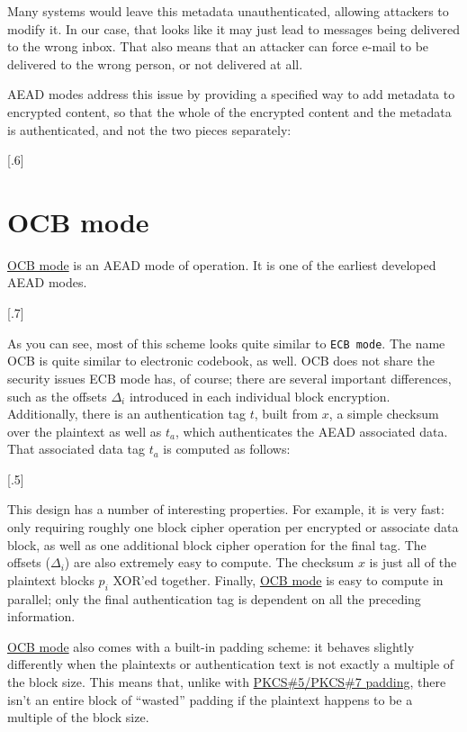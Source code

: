 \documentclass[11pt,ebook,table,dvipsnames]{memoir}
\begin{document}
Many systems would leave this metadata unauthenticated, allowing
attackers to modify it. In our case, that looks like it may just lead
to messages being delivered to the wrong inbox. That also means that
an attacker can force e-mail to be delivered to the wrong person, or
not delivered at all.

\Gls{AEAD} modes address this issue by providing a specified way to
add metadata to encrypted content, so that the whole of the encrypted
content and the metadata is authenticated, and not the two pieces
separately:

[.6]
\section{\label{OCB-mode}OCB mode}
\label{sec-2-7-8}

\hyperref[OCB-mode]{OCB mode} is an \gls{AEAD} mode of operation. It is one of the earliest
developed \glspl{AEAD mode}.

[.7]

As you can see, most of this scheme looks quite similar to \texttt{ECB mode}.
The name \gls{OCB} is quite similar to electronic codebook, as well.
OCB does not share the security issues ECB mode has, of course; there
are several important differences, such as the offsets $\Delta_i$
introduced in each individual block encryption. Additionally, there is
an authentication tag $t$, built from $x$, a simple checksum over the
plaintext as well as $t_a$, which authenticates the \gls{AEAD}
associated data. That associated data tag $t_a$ is computed as
follows:

[.5]

This design has a number of interesting properties. For example, it is
very fast: only requiring roughly one block cipher operation per
encrypted or associate data block, as well as one additional block
cipher operation for the final tag. The offsets ($\Delta_i$) are also
extremely easy to compute. The checksum $x$ is just all of the
plaintext blocks $p_i$ XOR'ed together. Finally, \hyperref[OCB-mode]{OCB mode} is easy to
compute in parallel; only the final authentication tag is dependent on
all the preceding information.

\hyperref[OCB-mode]{OCB mode} also comes with a built-in padding scheme: it behaves
slightly differently when the plaintexts or authentication text is not
exactly a multiple of the block size. This means that, unlike with
\hyperref[PKCS-5/PKCS-7-padding]{PKCS\#5/PKCS\#7 padding}, there isn't an entire block of \enquote{wasted} padding
if the plaintext happens to be a multiple of the block size.
\end{document}
